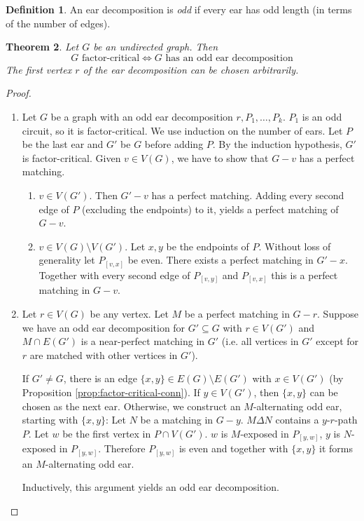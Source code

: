 \documentclass[11pt, a4paper]{article}
\newcommand{\set}[1]{\{#1\}}
\newtheorem{theorem}{Theorem}[section]
\theoremstyle{remark}
\theoremstyle{definition}
\newtheorem{definition}[theorem]{Definition}
\begin{document}
\begin{definition}
	An ear decomposition is \emph{odd} if every ear has odd length (in terms
	of the number of edges).
\end{definition}

\begin{theorem}
	Let $G$ be an undirected graph. Then
	\[G\text{ factor-critical}
		\Leftrightarrow G\text{ has an odd ear decomposition}\]
	The first vertex $r$ of the ear decomposition can be chosen
	arbitrarily.
\end{theorem}
\begin{proof}\
	\begin{enumerate}
		\item[''$\Leftarrow$'':]
		Let $G$ be a graph with an odd ear decomposition $r,P_1,\ldots,P_k$.
		$P_1$ is an odd circuit, so it is factor-critical. We use induction on the
		number of ears. Let $P$ be the last ear and $G'$ be $G$ before adding $P$.
		By the induction hypothesis, $G'$ is factor-critical.
		Given $v\in V(G)$, we have to show that $G-v$ has a perfect matching.
		\begin{enumerate}
			\item[Case 1:] $v\in V(G')$. Then $G'-v$ has a perfect matching. Adding
			every second edge of $P$ (excluding the endpoints) to it, yields a
			perfect matching of $G-v$.

			\item[Case 2:] $v\in V(G)\setminus V(G')$. Let $x,y$ be the endpoints of
			$P$. Without loss of generality let $P_{[v,x]}$ be even. There exists
			a perfect matching in $G'-x$. Together with every second edge of
			$P_{[v,y]}$ and $P_{[v,x]}$ this is a perfect matching in $G-v$.
		\end{enumerate}

		\item[''$\Rightarrow$'':]
		Let $r\in V(G)$ be any vertex. Let $M$ be a perfect matching in $G-r$.
		Suppose we have an odd ear decomposition for $G'\subseteq G$ with
		$r\in V(G')$ and $M\cap E(G')$ is a near-perfect matching in $G'$ (i.e.
		all vertices in $G'$ except for $r$ are matched with other vertices in $G'$).

		If $G'\neq G$, there is an edge $\set{x,y}\in E(G)\setminus E(G')$
		with $x\in V(G')$ (by Proposition \ref{prop:factor-critical-conn}).
		If $y\in V(G')$, then $\set{x,y}$ can be chosen as the next ear.
		Otherwise, we construct an $M$-alternating odd ear, starting with
		$\set{x,y}$: Let $N$ be a matching in $G-y$. $M\Delta N$ contains a
		$y$-$r$-path $P$. Let $w$ be the first vertex in $P\cap V(G')$. $w$
		is $M$-exposed in $P_{[y,w]}$, $y$ is $N$-exposed in $P_{[y,w]}$.
		Therefore $P_{[y,w]}$ is even and together with $\set{x,y}$ it forms
		an $M$-alternating odd ear.

		Inductively, this argument yields an odd ear decomposition.
	\end{enumerate}
\end{proof}
\end{document}
